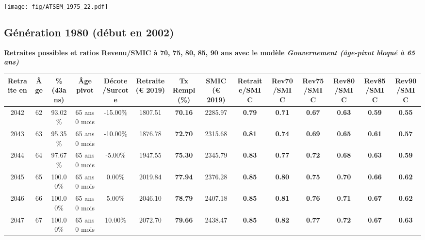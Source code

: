  \vspace{0.1cm} 

 \begin{center}\texttt{[image: fig/ATSEM\_1975\_22.pdf]}\end{center} \label{fig/ATSEM_1975_22.pdf} 

\newpage 
 
\subsection{Génération 1980 (début en 2002)} 

{\bf \noindent Retraites possibles et ratios Revenu/SMIC à 70, 75, 80, 85, 90 ans avec le modèle \emph{Gouvernement (âge-pivot bloqué à 65 ans)}}  
 
\begin{adjustbox}{max width=\textwidth} 
\begin{tabular}[htb]{|c|c||c|c|c||c|c||c||c|c|c|c|c|c|} 
\hline 
 Retraite en &  Âge &  \%(43ans) &  Âge pivot &  Décote/Surcote &  Retraite (\euro{} 2019) &  Tx Rempl(\%) &  SMIC (\euro{} 2019) &  Retraite/SMIC &  Rev70/SMIC &  Rev75/SMIC &  Rev80/SMIC &  Rev85/SMIC &  Rev90/SMIC \\ 
\hline \hline 
 2042 &  62 &  93.02\% &  65 ans 0 mois &  -15.00\% &  1807.51 &  {\bf 70.16} &  2285.97 &  {\bf {\color{red} 0.79}} &  {\bf {\color{red} 0.71}} &  {\bf {\color{red} 0.67}} &  {\bf {\color{red} 0.63}} &  {\bf {\color{red} 0.59}} &  {\bf {\color{red} 0.55}} \\ 
\hline 
 2043 &  63 &  95.35\% &  65 ans 0 mois &  -10.00\% &  1876.78 &  {\bf 72.70} &  2315.68 &  {\bf {\color{red} 0.81}} &  {\bf {\color{red} 0.74}} &  {\bf {\color{red} 0.69}} &  {\bf {\color{red} 0.65}} &  {\bf {\color{red} 0.61}} &  {\bf {\color{red} 0.57}} \\ 
\hline 
 2044 &  64 &  97.67\% &  65 ans 0 mois &  -5.00\% &  1947.55 &  {\bf 75.30} &  2345.79 &  {\bf {\color{red} 0.83}} &  {\bf {\color{red} 0.77}} &  {\bf {\color{red} 0.72}} &  {\bf {\color{red} 0.68}} &  {\bf {\color{red} 0.63}} &  {\bf {\color{red} 0.59}} \\ 
\hline 
 2045 &  65 &  100.00\% &  65 ans 0 mois &  0.00\% &  2019.84 &  {\bf 77.94} &  2376.28 &  {\bf {\color{red} 0.85}} &  {\bf {\color{red} 0.80}} &  {\bf {\color{red} 0.75}} &  {\bf {\color{red} 0.70}} &  {\bf {\color{red} 0.66}} &  {\bf {\color{red} 0.62}} \\ 
\hline 
 2046 &  66 &  100.00\% &  65 ans 0 mois &  5.00\% &  2046.10 &  {\bf 78.79} &  2407.18 &  {\bf {\color{red} 0.85}} &  {\bf {\color{red} 0.81}} &  {\bf {\color{red} 0.76}} &  {\bf {\color{red} 0.71}} &  {\bf {\color{red} 0.67}} &  {\bf {\color{red} 0.62}} \\ 
\hline 
 2047 &  67 &  100.00\% &  65 ans 0 mois &  10.00\% &  2072.70 &  {\bf 79.66} &  2438.47 &  {\bf {\color{red} 0.85}} &  {\bf {\color{red} 0.82}} &  {\bf {\color{red} 0.77}} &  {\bf {\color{red} 0.72}} &  {\bf {\color{red} 0.67}} &  {\bf {\color{red} 0.63}} \\ 
\hline 
\hline 
\end{tabular} 
\end{adjustbox} 
 
